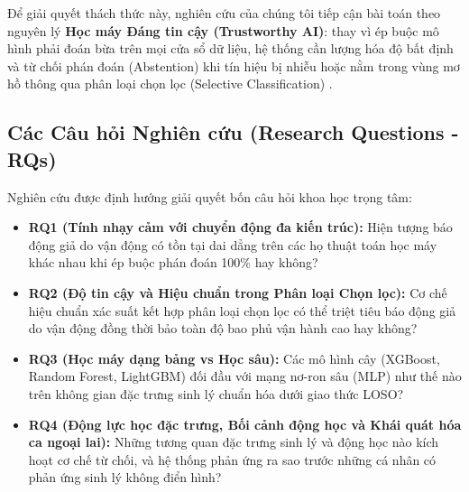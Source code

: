 \documentclass[conference]{IEEEtran}
\begin{document}
Để giải quyết thách thức này, nghiên cứu của chúng tôi tiếp cận bài toán theo nguyên lý \textbf{Học máy Đáng tin cậy (Trustworthy AI)}: thay vì ép buộc mô hình phải đoán bừa trên mọi cửa sổ dữ liệu, hệ thống cần lượng hóa độ bất định và từ chối phán đoán (Abstention) khi tín hiệu bị nhiễu hoặc nằm trong vùng mơ hồ thông qua phân loại chọn lọc (Selective Classification) \cite{chow1970optimum, cortes2016learning, geifman2017selective, geifman2019selectivenet, grandvalet2008support, hendrickx2024machine}.

\subsection{Các Câu hỏi Nghiên cứu (Research Questions - RQs)}
Nghiên cứu được định hướng giải quyết bốn câu hỏi khoa học trọng tâm:
\begin{itemize}
    \item \textbf{RQ1 (Tính nhạy cảm với chuyển động đa kiến trúc):} Hiện tượng báo động giả do vận động có tồn tại dai dẳng trên các họ thuật toán học máy khác nhau khi ép buộc phán đoán 100\% hay không?
    \item \textbf{RQ2 (Độ tin cậy và Hiệu chuẩn trong Phân loại Chọn lọc):} Cơ chế hiệu chuẩn xác suất kết hợp phân loại chọn lọc có thể triệt tiêu báo động giả do vận động đồng thời bảo toàn độ bao phủ vận hành cao hay không?
    \item \textbf{RQ3 (Học máy dạng bảng vs Học sâu):} Các mô hình cây (XGBoost, Random Forest, LightGBM) đối đầu với mạng nơ-ron sâu (MLP) như thế nào trên không gian đặc trưng sinh lý chuẩn hóa dưới giao thức LOSO?
    \item \textbf{RQ4 (Động lực học đặc trưng, Bối cảnh động học và Khái quát hóa ca ngoại lai):} Những tương quan đặc trưng sinh lý và động học nào kích hoạt cơ chế từ chối, và hệ thống phản ứng ra sao trước những cá nhân có phản ứng sinh lý không điển hình?
\end{itemize}
\end{document}
